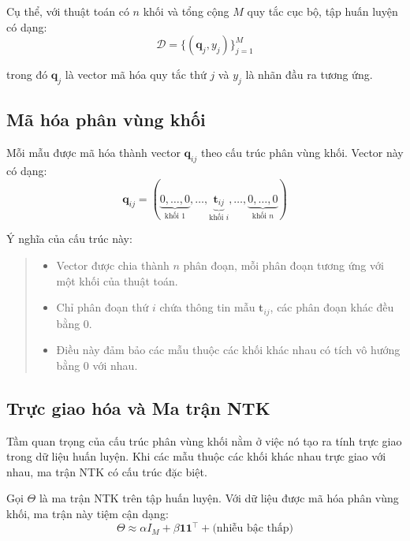 Cụ thể, với thuật toán có $n$ khối và tổng cộng $M$ quy tắc cục bộ, tập huấn luyện có dạng:
\begin{equation}
    \mathcal{D} = \{(\mathbf{q}_j, y_j)\}_{j=1}^{M}
\end{equation}

trong đó $\mathbf{q}_j$ là vector mã hóa quy tắc thứ $j$ và $y_j$ là nhãn đầu ra tương ứng.

\subsection{Mã hóa phân vùng khối}

Mỗi mẫu được mã hóa thành vector $\mathbf{q}_{ij}$ theo cấu trúc phân vùng khối. Vector này có dạng:
\begin{equation}
    \mathbf{q}_{ij} = (\underbrace{0, \ldots, 0}_{\text{khối } 1}, \ldots, \underbrace{\mathbf{t}_{ij}}_{\text{khối } i}, \ldots, \underbrace{0, \ldots, 0}_{\text{khối } n})
\end{equation}

Ý nghĩa của cấu trúc này:
\begin{quote}
\begin{itemize}
    \item Vector được chia thành $n$ phân đoạn, mỗi phân đoạn tương ứng với một khối của thuật toán.
    \item Chỉ phân đoạn thứ $i$ chứa thông tin mẫu $\mathbf{t}_{ij}$, các phân đoạn khác đều bằng 0.
    \item Điều này đảm bảo các mẫu thuộc các khối khác nhau có tích vô hướng bằng 0 với nhau.
\end{itemize}
\end{quote}

\subsection{Trực giao hóa và Ma trận NTK}

Tầm quan trọng của cấu trúc phân vùng khối nằm ở việc nó tạo ra tính trực giao trong dữ liệu huấn luyện. Khi các mẫu thuộc các khối khác nhau trực giao với nhau, ma trận NTK có cấu trúc đặc biệt.

Gọi $\Theta$ là ma trận NTK trên tập huấn luyện. Với dữ liệu được mã hóa phân vùng khối, ma trận này tiệm cận dạng:
\begin{equation}
    \Theta \approx \alpha I_M + \beta \mathbf{1}\mathbf{1}^\top + \text{(nhiễu bậc thấp)}
\end{equation}

